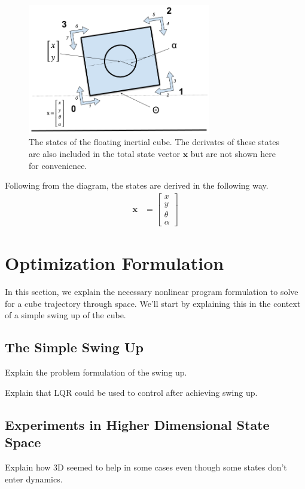 \documentclass[conference]{IEEEtran}
\begin{document}
\begin{figure}[htbp]
\centerline{\includegraphics[width=8cm,keepaspectratio]{media/cube_states.png}}
\caption{The states of the floating inertial cube. The derivates of these states are also included in the total state vector $\textbf{x}$ but are not shown here for convenience.}
\label{fig}
\end{figure}

Following from the diagram, the states are derived in the following way. \\
\begin{align}
    \textbf{x} &= \begin{bmatrix}
           x \\
           y \\
           \theta \\
           \alpha
         \end{bmatrix}
  \end{align}


\section{Optimization Formulation}
In this section, we explain the necessary nonlinear program formulation to solve for a cube trajectory through space. We'll start by explaining this in the context of a simple swing up of the cube.

\subsection{The Simple Swing Up}
Explain the problem formulation of the swing up.

Explain that LQR could be used to control after achieving swing up.

\subsection{Experiments in Higher Dimensional State Space}
Explain how 3D seemed to help in some cases even though some states don't enter dynamics.
\end{document}
